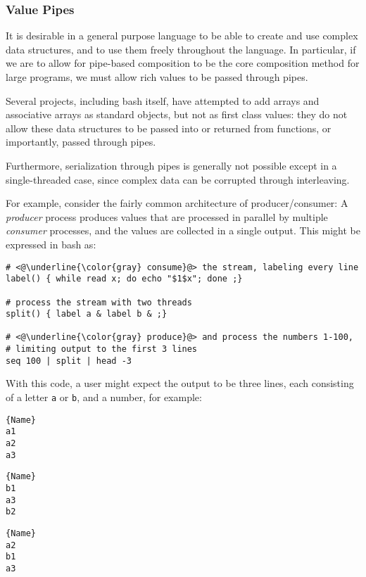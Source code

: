 \ifsigpro{ \documentclass[english,PRO]{ipsj} }
\begin{document}
\subsubsection{Value Pipes}\noindent
It is desirable in a general purpose language to be able to create and use complex data structures, and to use them freely throughout the language. In particular, if we are to allow for pipe-based composition to be the core composition method for large programs, we must allow rich values to be passed through pipes.

Several projects\cite{haahr,duff}, including bash itself, have attempted to add arrays and associative arrays as standard objects, but not as first class values: they do not allow these data structures to be passed into or returned from functions, or importantly, passed through pipes.

Furthermore, serialization through pipes is generally not possible except in a single-threaded case, since complex data can be corrupted through interleaving.

For example, consider the fairly common architecture of producer/consumer: A \emph{producer} process produces values that are processed in parallel by multiple \emph{consumer} processes, and the values are collected in a single output. This might be expressed in bash as:
\begin{lstlisting}[morekeywords={do,done}]
# <@\underline{\color{gray} consume}@> the stream, labeling every line
label() { while read x; do echo "$1$x"; done ;}

# process the stream with two threads
split() { label a & label b & ;}

# <@\underline{\color{gray} produce}@> and process the numbers 1-100,
# limiting output to the first 3 lines
seq 100 | split | head -3
\end{lstlisting}
With this code, a user might expect the output to be three lines, each consisting of a letter \verb/a/ or \verb/b/, and a number, for example:


\noindent\begin{minipage}{.14\textwidth}
\begin{lstlisting}{Name}
a1
a2
a3
\end{lstlisting}
\end{minipage}\hfill
\begin{minipage}{.14\textwidth}
\begin{lstlisting}{Name}
b1
a3
b2
\end{lstlisting}
\end{minipage}\hfill
\begin{minipage}{.14\textwidth}
\begin{lstlisting}{Name}
a2
b1
a3
\end{lstlisting}
\end{minipage}
\end{document}
